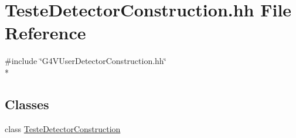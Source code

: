 \hypertarget{_teste_detector_construction_8hh}{\section{Teste\-Detector\-Construction.\-hh File Reference}
\label{_teste_detector_construction_8hh}
}
{\ttfamily \#include \char`\"{}G4\-V\-User\-Detector\-Construction.\-hh\char`\"{}}\\*
\subsection*{Classes}
\begin{DoxyCompactItemize}
\item 
class \hyperlink{class_teste_detector_construction}{Teste\-Detector\-Construction}
\end{DoxyCompactItemize}
